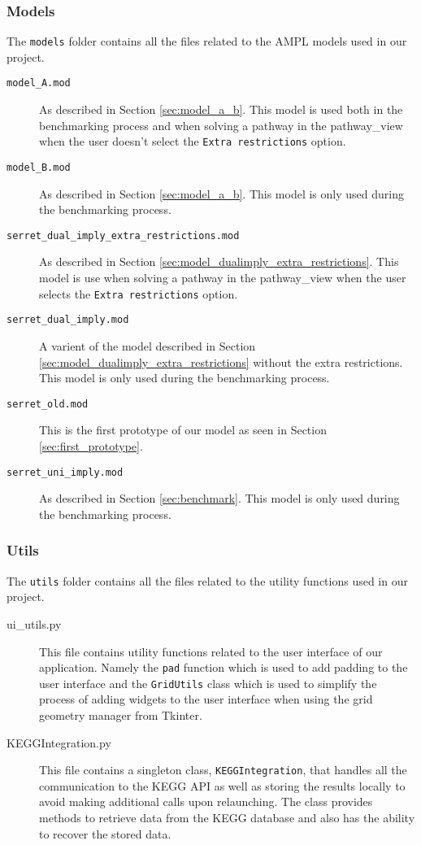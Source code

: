 \subsubsection{Models}

The \texttt{models} folder contains all the files related to the AMPL models used in our project.

\begin{description}
    \item[\texttt{model\_A.mod}] As described in Section \ref{sec:model_a_b}. This model is used both in the benchmarking process and when solving a pathway in the pathway\_view when the user doesn't select the \texttt{Extra restrictions} option.
    \item[\texttt{model\_B.mod}] As described in Section \ref{sec:model_a_b}. This model is only used during the benchmarking process.
    \item[\texttt{serret\_dual\_imply\_extra\_restrictions.mod}] As described in Section \ref{sec:model_dualimply_extra_restrictions}. This model is use when solving a pathway in the pathway\_view when the user selects the \texttt{Extra restrictions} option.
    \item[\texttt{serret\_dual\_imply.mod}] A varient of the model described in Section \ref{sec:model_dualimply_extra_restrictions} without the extra restrictions. This model is only used during the benchmarking process.
    \item[\texttt{serret\_old.mod}] This is the first prototype of our model as seen in Section \ref{sec:first_prototype}.
    \item[\texttt{serret\_uni\_imply.mod}] As described in Section \ref{sec:benchmark}. This model is only used during the benchmarking process.
\end{description}

\subsubsection{Utils}

The \texttt{utils} folder contains all the files related to the utility functions used in our project.

\begin{description}
    \item[ui\_utils.py] This file contains utility functions related to the user interface of our application. Namely the \texttt{pad} function which is used to add padding to the user interface and the \texttt{GridUtils} class which is used to simplify the process of adding widgets to the user interface when using the grid geometry manager from Tkinter.
    \item[KEGGIntegration.py] This file contains a singleton class, \texttt{KEGGIntegration}, that handles all the communication to the KEGG API as well as storing the results locally to avoid making additional calls upon relaunching. The class provides methods to retrieve data from the KEGG database and also has the ability to recover the stored data.
\end{description}

